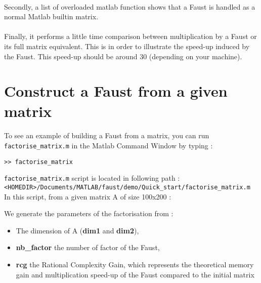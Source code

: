 \paragraph{}Secondly, a list of overloaded matlab function shows that a Faust is handled as a normal Matlab builtin matrix.
 


\paragraph{}Finally, it performs a little time comparison between multiplication by a Faust or its full matrix equivalent.
This is in order to illustrate the speed-up induced by the Faust. This speed-up should be around 30 (depending on your machine).
%

\newpage
\section{Construct a Faust from a given matrix}\label{sec:firstUseBuildFromMatrix}
\paragraph{} To see an example of building a Faust from a matrix, you can run \texttt{factorise\_matrix.m} in the Matlab Command Window by typing :
\begin{lstlisting}
>> factorise_matrix
\end{lstlisting}
\texttt{factorise\_matrix.m} script is located in following path :\\
\texttt{<HOMEDIR>/Documents/MATLAB/faust/demo/Quick\_start/factorise\_matrix.m} \\

In this script, from a given matrix A of size 100x200 :

We generate the parameters of the factorisation from :
\begin{itemize}
\item The dimension of A (\textbf{dim1} and \textbf{dim2}),
\item \textbf{nb\_factor} the number of factor of the Faust,
\item \textbf{rcg} the Rational Complexity Gain, which represents the theoretical memory gain and multiplication speed-up of the Faust compared to the initial matrix 
\end{itemize}

